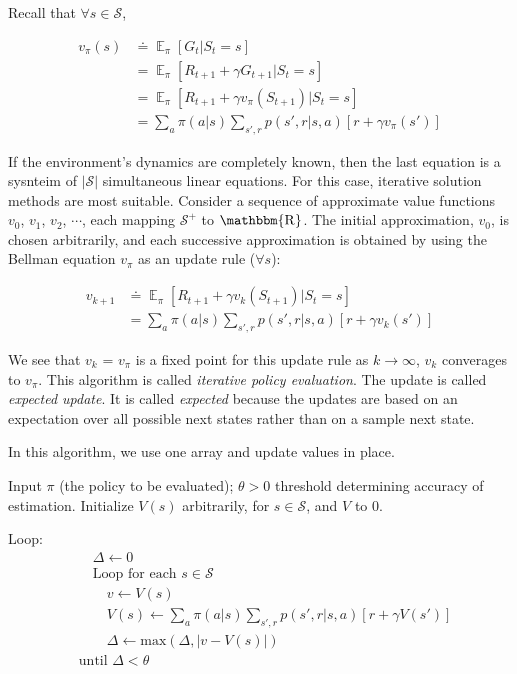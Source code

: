 \documentclass[lang=en,mode=geye,device=normal,color=blue,14pt]{elegantnote}
\DeclareMathOperator*{\E}{\mathbb{E}}
\DeclareMathOperator*{\1}{\mathbbm{1}}
\DeclareMathOperator*{\R}{\mathbbm{R}}
\begin{document}
Recall that $\forall s \in \mathcal{S}$,

\begin{align*}
v_\pi(s) & \doteq \E_\pi [G_t | S_t = s] \\
& = \E_\pi [R_{t+1} + \gamma G_{t+1} | S_t = s] \\
& = \E_\pi [R_{t+1} + \gamma v_\pi (S_{t+1}) | S_t = s] \\
& = \sum_a \pi (a|s) \sum_{s',r} p(s',r|s,a) [r+\gamma v_\pi (s')]
\end{align*}

If the environment's dynamics are completely known, then the last equation is a sysnteim of $|\mathcal{S}|$ simultaneous linear equations.
For this case, iterative solution methods are most suitable. Consider a sequence of approximate value functions $v_0$, $v_1$, $v_2$, $\cdots$, each mapping $\mathcal{S^+}$ to $\R$.
The initial approximation, $v_0$, is chosen arbitrarily, and each successive approximation is obtained by using the Bellman equation $v_\pi$ as an update rule ($\forall s$):

\begin{align*}
v_{k+1} & \doteq \E_\pi [R_{t+1} + \gamma v_k (S_{t+1}) | S_t = s] \\
& = \sum_a \pi (a|s) \sum_{s',r} p(s',r|s,a)[r+\gamma v_k (s')]
\end{align*}

We see that $v_k$ = $v_\pi$ is a fixed point for this update rule as $k \rightarrow \infty$, $v_k$ converages to $v_\pi$. This algorithm is called \textit{iterative policy evaluation}.
The update is called \textit{expected update}. It is called \textit{expected} because the updates are based on an expectation over all possible next states rather than on a sample next state.

In this algorithm, we use one array and update values in place.
\begin{tcolorbox}[width=\textwidth,title={Iterative Policy Evaluation, for estimating $V \approx v_\pi$}]
Input $\pi$ (the policy to be evaluated); $\theta > 0$ threshold determining accuracy of estimation.
Initialize $V(s)$ arbitrarily, for $s \in \mathcal{S}$, and $V$ to 0.

Loop:
\begin{align*}
&\quad\Delta \leftarrow 0 \\
&\quad\text{Loop for each } s \in \mathcal{S} \\
&\quad\quad v \leftarrow V(s) \\
&\quad\quad V(s) \leftarrow \sum_a \pi (a|s) \sum_{s',r} p(s',r|s,a)[r + \gamma V(s')] \\
&\quad\quad \Delta \leftarrow \text{max}(\Delta, |v-V(s)|) \\
&\text{until } \Delta < \theta
\end{align*}
\end{tcolorbox}
\end{document}
